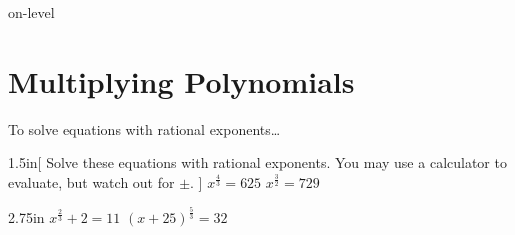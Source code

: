\begin{taggedblock}{on-level}

\section{Multiplying Polynomials}

\begin{myConceptSteps}{To solve equations with rational exponents\dots}
\end{myConceptSteps}



\begin{my2Problems}[\large]{1.5in}[
        Solve these equations with rational exponents.
        You may use a calculator to evaluate, but watch out for {\Large$\pm$}.
        ]
    {
        $ x^{\frac{4}{3}} = 625 $
    }
    {
        $ x^{\frac{3}{2}} = 729 $
    }
\end{my2Problems}
\begin{my2Problems}[\large]{2.75in}
    {
        $ x^{\frac{2}{3}} + 2 = 11 $
    }
    {
        $ (x+25)^{\frac{5}{3}} = 32 $
    }
\end{my2Problems}


\end{taggedblock}
